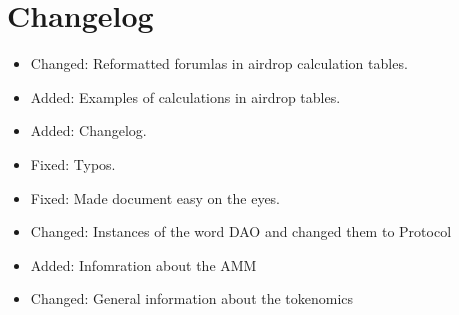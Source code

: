 \documentclass[11pt, nofootinbib]{article}
\begin{document}
\newpage

\section{Changelog}

\normalsize
\begin{itemize}
\item Changed: Reformatted forumlas in airdrop calculation tables.
\item Added: Examples of calculations in airdrop tables.
\item Added: Changelog.
\item Fixed: Typos.
\item Fixed: Made document easy on the eyes.
\item Changed: Instances of the word DAO and changed them to Protocol
\item Added: Infomration about the AMM
\item Changed: General information about the tokenomics

\end{itemize}
\end{document}
